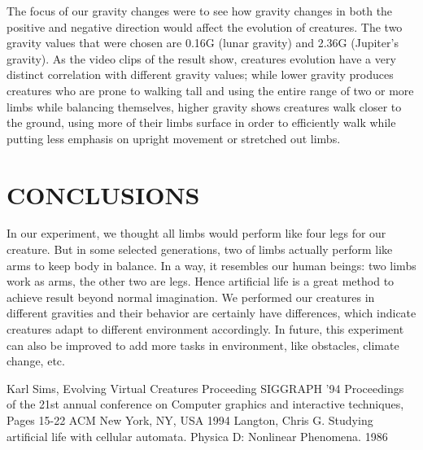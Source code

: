 \documentclass[letterpaper, 10 pt, conference]{ieeeconf}  %
\begin{document}
The focus of our gravity changes were to see how gravity changes in both the positive and negative direction would affect the evolution of creatures. The two gravity values that were chosen are 0.16G (lunar gravity) and 2.36G (Jupiter's gravity). As the video clips of the result show, creatures evolution have a very distinct correlation with different gravity values; while lower gravity produces creatures who are prone to walking tall and using the entire range of two or more limbs while balancing themselves, higher gravity shows creatures walk closer to the ground, using more of their limbs surface in order to efficiently walk while putting less emphasis on upright movement or stretched out limbs.

\section{CONCLUSIONS}
 

\addtolength{\textheight}{-12cm}   %






In our experiment, we thought all limbs would perform like four legs for our creature. But in some selected generations, two of limbs actually perform like arms to keep body in balance. In a way, it resembles our human beings: two limbs work as arms, the other two are legs. Hence artificial life is a great method to achieve result beyond normal imagination. We performed our creatures in different gravities and their behavior are certainly have differences, which indicate creatures adapt to different environment accordingly. In future, this experiment can also be improved to add more tasks in environment, like obstacles, climate change, etc. 



\begin{thebibliography}{99}

 Karl Sims, Evolving Virtual Creatures Proceeding
SIGGRAPH '94 Proceedings of the 21st annual conference on Computer graphics and interactive techniques, Pages 15-22 
ACM New York, NY, USA 1994   
 Langton, Chris G. Studying artificial life with cellular automata. Physica D: Nonlinear Phenomena. 1986




\end{thebibliography}
\end{document}
